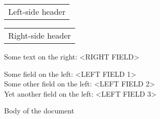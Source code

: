 \documentclass{article}
\begin{document}

\noindent\begin{tabular}[t]{@{}l@{}}
    Left-side header
\end{tabular}%
\hfill
\begin{tabular}[t]{@{}r@{}}
    Right-side header
\end{tabular}

\vspace{1cm}

\begin{flushright}
    Some text on the right: <RIGHT FIELD>
\end{flushright}

\vspace{1cm}

\begin{flushleft}
    Some field on the left: <LEFT FIELD 1>\\

    Some other field on the left: <LEFT FIELD 2>\\

    Yet another field on the left: <LEFT FIELD 3>\\
\end{flushleft}

\vspace{1cm}

Body of the document
\end{document}
